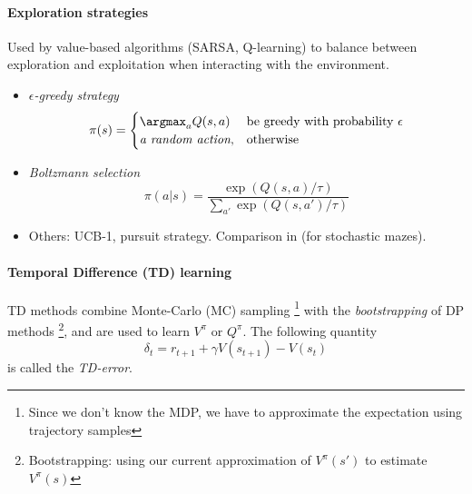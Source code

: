 \paragraph{Exploration strategies} \label{paragraph:exploration-strategies} Used by value-based algorithms (SARSA, Q-learning) to balance between exploration and exploitation when interacting with the environment.
\begin{itemize}
    \item \emph{$\epsilon$-greedy strategy}
        \[
          \pi(s)=\begin{cases}
            \argmax_a Q(s,a) & \text{be greedy with probability $\epsilon$}\\
            \textit{a random action}, & \text{otherwise}
          \end{cases}
        \]
    \item \emph{Boltzmann selection}
        \[
          \pi(a|s) = \frac{\exp(Q(s,a)/\tau)}{\sum_{a'} \exp(Q(s,a')/\tau)}
        \]
    \item Others: UCB-1, pursuit strategy. Comparison in \cite{tijsma2016comparing} (for stochastic mazes).
\end{itemize}

\paragraph{Temporal Difference (TD) learning} TD methods combine Monte-Carlo (MC) sampling \footnote{Since we don't know the MDP, we have to approximate the expectation using trajectory samples} with the \emph{bootstrapping} of DP methods \footnote{Bootstrapping: using our current approximation of $V^{\pi}(s')$ to estimate $V^{\pi}(s)$}, and are used to learn $V^\pi$ or $Q^\pi$. The following quantity
\[
    \delta_t = r_{t+1} + \gamma V(s_{t+1}) - V(s_t)
\]
is called the \emph{TD-error}.

